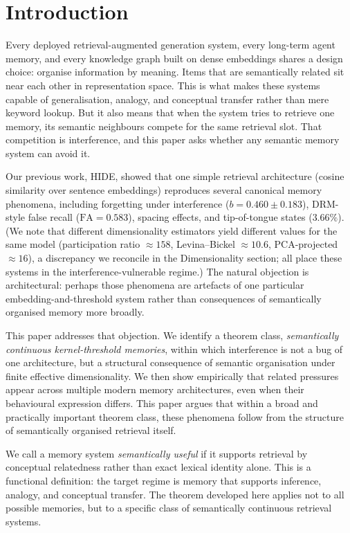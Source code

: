 \documentclass[11pt]{article}
\begin{document}
\section*{Introduction}

Every deployed retrieval-augmented generation system, every long-term agent memory, and every knowledge graph built on dense embeddings shares a design choice: organise information by meaning. Items that are semantically related sit near each other in representation space. This is what makes these systems capable of generalisation, analogy, and conceptual transfer rather than mere keyword lookup. But it also means that when the system tries to retrieve one memory, its semantic neighbours compete for the same retrieval slot. That competition is interference, and this paper asks whether any semantic memory system can avoid it.

Our previous work, HIDE\cite{gopinath2025}, showed that one simple retrieval architecture (cosine similarity over sentence embeddings) reproduces several canonical memory phenomena, including forgetting under interference ($b = 0.460 \pm 0.183$), DRM-style false recall ($\text{FA} = 0.583$), spacing effects, and tip-of-tongue states ($3.66\%$). (We note that different dimensionality estimators yield different values for the same model (participation ratio $\approx 158$, Levina--Bickel $\approx 10.6$, PCA-projected $\approx 16$), a discrepancy we reconcile in the Dimensionality section; all place these systems in the interference-vulnerable regime.) The natural objection is architectural: perhaps those phenomena are artefacts of one particular embedding-and-threshold system rather than consequences of semantically organised memory more broadly.

This paper addresses that objection. We identify a theorem class, \textit{semantically continuous kernel-threshold memories}, within which interference is not a bug of one architecture, but a structural consequence of semantic organisation under finite effective dimensionality. We then show empirically that related pressures appear across multiple modern memory architectures, even when their behavioural expression differs. This paper argues that within a broad and practically important theorem class, these phenomena follow from the structure of semantically organised retrieval itself.

We call a memory system \textit{semantically useful} if it supports retrieval by conceptual relatedness rather than exact lexical identity alone. This is a functional definition: the target regime is memory that supports inference, analogy, and conceptual transfer. The theorem developed here applies not to all possible memories, but to a specific class of semantically continuous retrieval systems.
\end{document}
